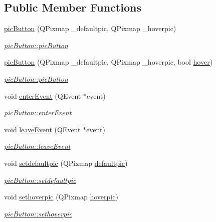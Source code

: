 \subsection*{Public Member Functions}
\begin{DoxyCompactItemize}
\item 
\hyperlink{classpic_button_a1d5dc5f3e6a73e24dd873fb6a33a3e7f}{pic\+Button} (Q\+Pixmap \+\_\+defaultpic, Q\+Pixmap \+\_\+hoverpic)
\begin{DoxyCompactList}\small\item\em \hyperlink{classpic_button_a1d5dc5f3e6a73e24dd873fb6a33a3e7f}{pic\+Button\+::pic\+Button} \end{DoxyCompactList}\item 
\hyperlink{classpic_button_a6c7eca4ea10251d19dde58edea0f0e12}{pic\+Button} (Q\+Pixmap \+\_\+defaultpic, Q\+Pixmap \+\_\+hoverpic, bool \hyperlink{classpic_button_ab011ab567cb14054023cc46cfc3110c1}{hover})
\begin{DoxyCompactList}\small\item\em \hyperlink{classpic_button_a1d5dc5f3e6a73e24dd873fb6a33a3e7f}{pic\+Button\+::pic\+Button} \end{DoxyCompactList}\item 
void \hyperlink{classpic_button_a8e06509469d6b2c5efe9c58558209350}{enter\+Event} (Q\+Event $\ast$event)
\begin{DoxyCompactList}\small\item\em \hyperlink{classpic_button_a8e06509469d6b2c5efe9c58558209350}{pic\+Button\+::enter\+Event} \end{DoxyCompactList}\item 
void \hyperlink{classpic_button_a22c110a8f610d4a315b2c260e7d1f2b9}{leave\+Event} (Q\+Event $\ast$event)
\begin{DoxyCompactList}\small\item\em \hyperlink{classpic_button_a22c110a8f610d4a315b2c260e7d1f2b9}{pic\+Button\+::leave\+Event} \end{DoxyCompactList}\item 
void \hyperlink{classpic_button_a38c0a41c10500e605cda766094ee00a5}{setdefaultpic} (Q\+Pixmap \hyperlink{classpic_button_a13f03c5d3c47b0a10b3798f9588a8cf5}{defaultpic})
\begin{DoxyCompactList}\small\item\em \hyperlink{classpic_button_a38c0a41c10500e605cda766094ee00a5}{pic\+Button\+::setdefaultpic} \end{DoxyCompactList}\item 
void \hyperlink{classpic_button_a632d61dedf5693fcade81c6a998a377d}{sethoverpic} (Q\+Pixmap \hyperlink{classpic_button_a6e387b9fc6348b681a786db8452fbc9d}{hoverpic})
\begin{DoxyCompactList}\small\item\em \hyperlink{classpic_button_a632d61dedf5693fcade81c6a998a377d}{pic\+Button\+::sethoverpic} \end{DoxyCompactList}\end{DoxyCompactItemize}
